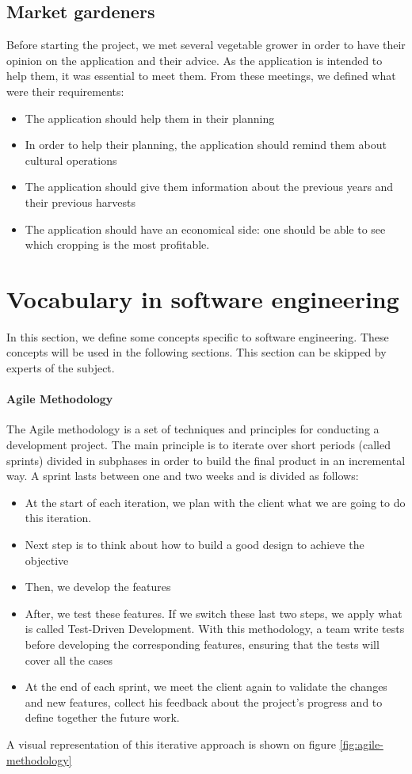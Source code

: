 \subsection{Market gardeners}
Before starting the project, we met several vegetable grower in order to have their opinion on the application and their advice. As the application is intended to help them, it was essential to meet them. From these meetings, we defined what were their requirements:
\begin{itemize}
\item The application should help them in their planning
\item In order to help their planning, the application should remind them about cultural operations
\item The application should give them information about the previous years and their previous harvests
\item The application should have an economical side: one should be able to see which cropping is the most profitable.
\end{itemize} 

\section{Vocabulary in software engineering}
In this section, we define some concepts specific to software engineering. These concepts will be used in the following sections. This section can be skipped by experts of the subject.
\paragraph{Agile Methodology}\label{par:agilemethodology}
The Agile methodology is a set of techniques and principles for conducting a development project. The main principle is to iterate over short periods (called sprints) divided in subphases in order to build the final product in an incremental way.
A sprint lasts between one and two weeks and is divided as follows: 
\begin{itemize}
    \item At the start of each iteration, we plan with the client what we are going to do this iteration.
    \item Next step is to think about how to build a good design to achieve the objective
    \item Then, we develop the features
    \item After, we test these features. If we switch these last two steps, we apply what is called Test-Driven Development. With this methodology, a team write tests before developing the corresponding features, ensuring that the tests will cover all the cases
    \item At the end of each sprint, we meet the client again to validate the changes and new features, collect his feedback about the project's progress and to define together the future work.
\end{itemize}
A visual representation of this iterative approach is shown on figure \ref{fig:agile-methodology}



